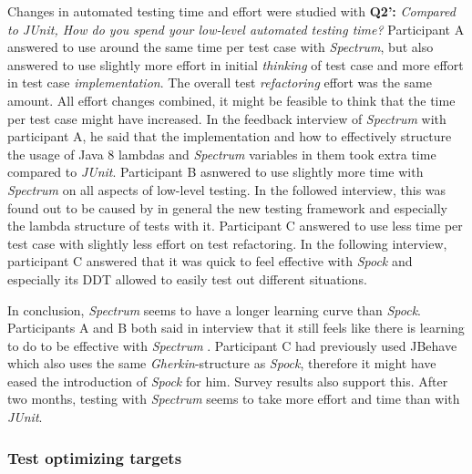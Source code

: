 Changes in automated testing time and effort were studied with \textbf{Q2':} \textit{Compared to JUnit, How do you spend your low-level automated testing time?}
Participant A answered
to use around the same time per test case with \textit{Spectrum}, but also answered to use slightly more effort in initial \textit{thinking} of test
case and more effort in test case \textit{implementation}. The overall test \textit{refactoring} effort was the same amount. All effort changes combined, it might
be feasible to think that the time per test case might have increased. In the feedback interview of \textit{Spectrum} with participant
A, he said that the implementation and how to effectively structure the usage of Java 8 lambdas and \textit{Spectrum} variables
in them took extra time compared to \textit{JUnit}. Participant B asnwered to use slightly more time with \textit{Spectrum} on all aspects of low-level testing.
In the followed interview, this was found out to be caused by in general the new testing framework and especially the lambda structure
of tests with it. Participant C answered to use less time per test case with slightly less effort on test refactoring. In the
following interview, participant C answered that it was quick to feel effective with \textit{Spock} and especially its DDT allowed to
easily test out different situations.

In conclusion, \textit{Spectrum} seems to have a longer learning curve than \textit{Spock}. Participants A and B both said in interview that it still
feels like there is learning to do to be effective with \textit{Spectrum} . Participant C had previously used JBehave which also
uses the same \textit{Gherkin}-structure as \textit{Spock}, therefore it might have eased the introduction of \textit{Spock} for him. Survey
results also support this. After two months, testing with \textit{Spectrum} seems to take more effort and time than with \textit{JUnit}.

\subsubsection{Test optimizing targets}

